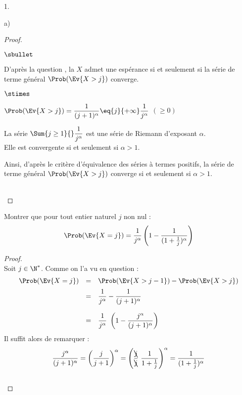 \documentclass[11pt]{article}%
\begin{document}
\begin{noliste}{1.}
\begin{noliste}{a)}
    \begin{proof}~%
      \begin{noliste}{$\sbullet$}
      \item D'après la question , la \var $X$ admet une
        espérance si et seulement si la série de terme général
        $\Prob(\Ev{X > j})$ converge.

      \item
        \begin{noliste}{$\stimes$}
        \item $\Prob(\Ev{X > j}) = \dfrac{1}{(j+1)^\alpha}
          \eq{j}{+\infty} \dfrac{1}{j^\alpha}$ $(\geq 0)$

        \item La série $\Sum{j \geq 1}{} \dfrac{1}{j^\alpha}$ est
          une série de Riemann d'exposant $\alpha$.\\
          Elle est convergente si et seulement si $\alpha > 1$.
        \end{noliste}
        Ainsi, d'après le critère d'équivalence des séries à termes
        positifs, la série de terme général $\Prob(\Ev{X > j})$
        converge si et seulement si $\alpha > 1$.        
      \end{noliste}
      ~\\[-1.2cm]
    \end{proof}

  \item Montrer que pour tout entier naturel $j$ non nul :
    \[
    \Prob(\Ev{X=j}) = \dfrac{1}{j^{\alpha}} \left( 1 -
      \dfrac{1}{(1+\frac{1}{j})^{\alpha}}\right)
    \]
    
    \begin{proof}~\\
      Soit $j \in \N^*$. Comme on l'a vu en question  :
      \[
      \begin{array}{rcl}
        \Prob(\Ev{X = j}) & = & \Prob(\Ev{X > j-1}) - \Prob(\Ev{X >
          j})
        \\[.2cm]
        & = & \dfrac{1}{j^{\alpha}} - \dfrac{1}{(j+1)^{\alpha}} 
        \\[.6cm]
        & = & \dfrac{1}{j^{\alpha}} \ \left( 1 -
          \dfrac{j^\alpha}{(j+1)^{\alpha}} \right)
      \end{array}
      \]
      Il suffit alors de remarquer : 
      \[
      \dfrac{j^\alpha}{(j+1)^{\alpha}} = \left( \dfrac{j}{j+1}
      \right)^\alpha = \left(\dfrac{\bcancel{j}}{\bcancel{j}} \
        \dfrac{1}{1+\frac{1}{j}} \right)^\alpha = \dfrac{1}{(1 +
        \frac{1}{j})^\alpha}
      \]
      ~\\[-1cm]
    \end{proof}


\end{noliste}
\end{noliste}
\end{document}
